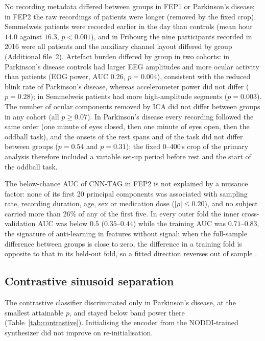 No recording metadata differed between groups in FEP1 or Parkinson's disease; in FEP2 the raw recordings of patients were longer (removed by the fixed crop). Semmelweis patients were recorded earlier in the day than controls (mean hour $14.0$ against $16.3$, $p<0.001$), and in Fribourg the nine participants recorded in 2016 were all patients and the auxiliary channel layout differed by group (Additional file~2). Artefact burden differed by group in two cohorts: in Parkinson's disease controls had larger EEG amplitudes and more ocular activity than patients (EOG power, AUC $0.26$, $p=0.004$), consistent with the reduced blink rate of Parkinson's disease, whereas accelerometer power did not differ ($p=0.28$); in Semmelweis patients had more high-amplitude segments ($p=0.003$). The number of ocular components removed by ICA did not differ between groups in any cohort (all $p\geq0.07$). In Parkinson's disease every recording followed the same order (one minute of eyes closed, then one minute of eyes open, then the oddball task), and the onsets of the rest spans and of the task did not differ between groups ($p=0.54$ and $p=0.31$); the fixed 0--400\,s crop of the primary analysis therefore included a variable set-up period before rest and the start of the oddball task.

The below-chance AUC of CNN-TAG in FEP2 is not explained by a nuisance factor: none of its first 20 principal components was associated with sampling rate, recording duration, age, sex or medication dose ($|\rho|\leq0.20$), and no subject carried more than $26\%$ of any of the first five. In every outer fold the inner cross-validation AUC was below $0.5$ ($0.35$--$0.44$) while the training AUC was $0.71$--$0.83$, the signature of anti-learning in features without signal: when the full-sample difference between groups is close to zero, the difference in a training fold is opposite to that in its held-out fold, so a fitted direction reverses out of sample \cite{varoquaux2018}.

\subsection{Contrastive sinusoid separation}\label{section:res_contrastive}

 The contrastive classifier discriminated only in Parkinson's disease, at the smallest attainable $p$, and stayed below band power there (Table~\ref{tab:contrastive}). Initialising the encoder from the NODDI-trained synthesizer did not improve on re-initialisation.

